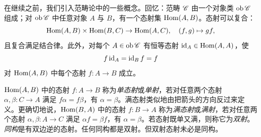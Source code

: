 在继续之前，我们引入范畴论中的一些概念。回忆：范畴 $\mathscr{C}$ 由一个对象类 $\operatorname{ob}\mathscr{C}$ 组成；对 $\operatorname{ob}\mathscr{C}$ 中任意对象 $A$ 与 $B$，有一个态射集 $\operatorname{Hom}(A,B)$。态射可以复合：
\[
\operatorname{Hom}(A,B)\times\operatorname{Hom}(B,C)\to \operatorname{Hom}(A,C),\quad (f,g)\mapsto gf,
\]
且复合满足结合律。此外，对每个 $A\in \operatorname{ob}\mathscr{C}$ 有恒等态射 $\operatorname{id}_A\in \operatorname{Hom}(A,A)$，使
\[
f\operatorname{id}_A=\operatorname{id}_B f=f
\]
对 $\operatorname{Hom}(A,B)$ 中每个态射 $f\colon A\to B$ 成立。

$\operatorname{Hom}(A,B)$ 中的态射 $f\colon A\to B$ 称为\emph{单态射}或\emph{单射}，若对任意两个态射 $\alpha,\beta\colon C\to A$ 满足 $f\alpha=f\beta$，有 $\alpha=\beta$。满态射类似地由把箭头的方向反过来定义。更确切地说，$\operatorname{Hom}(B,A)$ 中的态射 $f\colon B\to A$ 称为\emph{满态射}或\emph{满射}，若对任意两个态射 $\alpha,\beta\colon A\to C$ 满足 $\alpha f=\beta f$，有 $\alpha=\beta$。若态射既单又满，则称它为\emph{双射}。\emph{同构}是有双边逆的态射。任何同构都是双射。但双射态射未必是同构。
